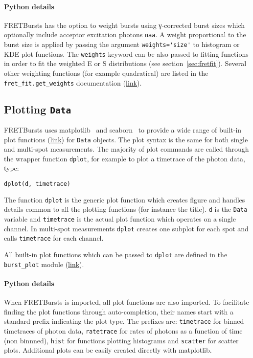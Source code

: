 \paragraph{Python details}
FRETBursts has the option to weight bursts using γ-corrected
burst sizes which optionally include acceptor excitation photons \verb|naa|.
A weight proportional to the burst size is applied by passing the argument
\verb|weights='size'| to histogram or KDE plot functions. The \verb|weights|
keyword can be also passed to fitting functions in order to fit
the weighted E or S distributions (see section~\ref{sec:fretfit}).
Several other weighting functions (for example quadratical) are listed in the
\verb|fret_fit.get_weights| documentation
(\href{http://fretbursts.readthedocs.org/en/latest/fret_fit.html#fretbursts.fret_fit.get_weights}{link}).

\subsection{Plotting \texttt{Data}}
\label{sec:plotting}

FRETBursts uses
matplotlib~\cite{matplotlib}
and seaborn~\cite{seaborn}
to provide a wide range of built-in plot functions
(\href{http://fretbursts.readthedocs.org/en/latest/plots.html}{link})
for \verb|Data| objects.
The plot syntax is the same for both single and multi-spot measurements.
The majority of plot commands are called through the wrapper function
\verb|dplot|, for example to plot a timetrace of the photon data, type:

\begin{lstlisting}
dplot(d, timetrace)
\end{lstlisting}

The function \verb|dplot| is the generic plot function which creates figure
and handles details common to all the plotting functions (for instance the title).
\verb|d| is the \verb|Data| variable and \verb|timetrace| is the actual plot
function which operates on a single channel. In multi-spot measurements
\verb|dplot| creates one subplot for each spot and calls \verb|timetrace| for
each channel.

All built-in plot functions which can be passed to
\verb|dplot| are defined in the
\verb|burst_plot| module
(\href{http://fretbursts.readthedocs.org/en/latest/plots.html}{link}).

\paragraph{Python details}
When FRETBursts is imported, all plot functions are also imported.
To facilitate finding the plot functions through auto-completion,
their names start with a standard prefix indicating the
plot type. The prefixes are: \verb|timetrace| for binned timetraces
of photon data, \verb|ratetrace| for rates of photons as a function of time (non
binnned), \verb|hist| for functions plotting histograms and \verb|scatter| for
scatter plots.
Additional plots can be easily created directly with matplotlib.

